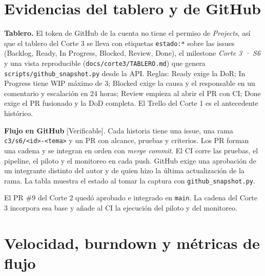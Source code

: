 \documentclass[10pt,a4paper]{article}
\newcommand{\rot}[1]{\textsf{\scriptsize\color{gris}[#1]}}
\begin{document}
\begin{table}[h]
\caption{Aceptación de las historias de S6 por criterio}\label{tab:acc6}

\end{table}

\section{Evidencias del tablero y de GitHub}

\textbf{Tablero.} El token de GitHub de la cuenta no tiene el permiso de \emph{Projects}, así que el tablero del Corte 3 se lleva con etiquetas \texttt{estado:*} sobre las issues (Backlog, Ready, In Progress, Blocked, Review, Done), el milestone \emph{Corte 3 · S6} y una vista reproducible (\texttt{docs/corte3/TABLERO.md}) que genera \texttt{scripts/github\_snapshot.py} desde la API. Reglas: Ready exige la DoR; In Progress tiene WIP máximo de 3; Blocked exige la causa y el responsable en un comentario y escalación en 24 horas; Review empieza al abrir el PR con CI; Done exige el PR fusionado y la DoD completa. El Trello del Corte 1 es el antecedente histórico.

\textbf{Flujo en GitHub} \rot{Verificable}. Cada historia tiene una issue, una rama \texttt{c3/s6/<id>-<tema>} y un PR con alcance, pruebas y criterios. Los PR forman una cadena y se integran en orden con \emph{merge commit}. El CI corre las pruebas, el pipeline, el piloto y el monitoreo en cada push. GitHub exige una aprobación de un integrante distinto del autor y de quien hizo la última actualización de la rama. La tabla muestra el estado al tomar la captura con \texttt{github\_snapshot.py}.

\begin{table}[h]
\caption{Bitácora de GitHub del Corte 3 (leída de la API al generar el informe)}\label{tab:gh}

\end{table}

El PR \#9 del Corte 2 quedó aprobado e integrado en \texttt{main}. La cadena del Corte 3 incorpora esa base y añade al CI la ejecución del piloto y del monitoreo.

\section{Velocidad, burndown y métricas de flujo}
\end{document}
